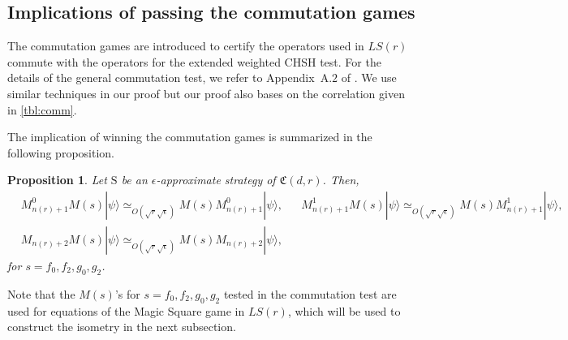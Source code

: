 \documentclass[11pt,letterpaper]{article}
\newcommand{\ket}[1]{|#1\rangle}
\newcommand{\1}{\mathbb{1}}
\newcommand{\LS}{LS}
\newcommand{\nr}{n(r)}
\newcommand{\fC}{\mathfrak{C}}
\newcommand{\bS}{\mathrm{S}}
\newcommand{\ep}{\epsilon}
\newcommand{\se}{\sqrt{\epsilon}}
\newcommand{\sr}{\sqrt{r}}
\newcommand{\appd}[1]{\simeq_{#1}}
\newtheorem{proposition}[theorem]{Proposition}
\theoremstyle{definition}
\begin{document}
\subsection{Implications of passing the commutation games}
\label{sec:imp_comm}
The commutation games are introduced to certify the operators used in $\LS(r)$ commute with 
the operators for the extended weighted CHSH test. For the details of the general commutation test, 
we refer to Appendix~A.$2$ of \cite{coladan2017verifier}. 
We use similar techniques in our proof but our proof also bases on the correlation given in \cref{tbl:comm}.

The implication of winning the commutation games is summarized in the following proposition.
\begin{proposition}
	\label{prop:rel_comm}
	Let $\bS$ be an $\ep$-approximate strategy of $\fC(d,r)$.
	Then, 
	\begin{align}
		&M_{\nr+1}^0 M(s) \ket{\psi} \appd{O(\sr \se)} M(s) M_{\nr+1}^0 \ket{\psi}, &&
		M_{\nr+1}^1 M(s) \ket{\psi} \appd{O(\sr \se)} M(s) M_{\nr+1}^1 \ket{\psi}, \\
		\label{eq:com_nr2} &M_{\nr+2} M(s) \ket{\psi} \appd{O(\sr \se)} M(s) M_{\nr+2} \ket{\psi},
	\end{align}
	for $s = f_0, f_2,g_0,g_2$.
\end{proposition}
Note that the $M(s)$'s for $s = f_0, f_2,g_0,g_2$ tested in the commutation test are used for
equations of the Magic Square game in $\LS(r)$,
which will be used to construct the isometry in the next subsection.
\end{document}
